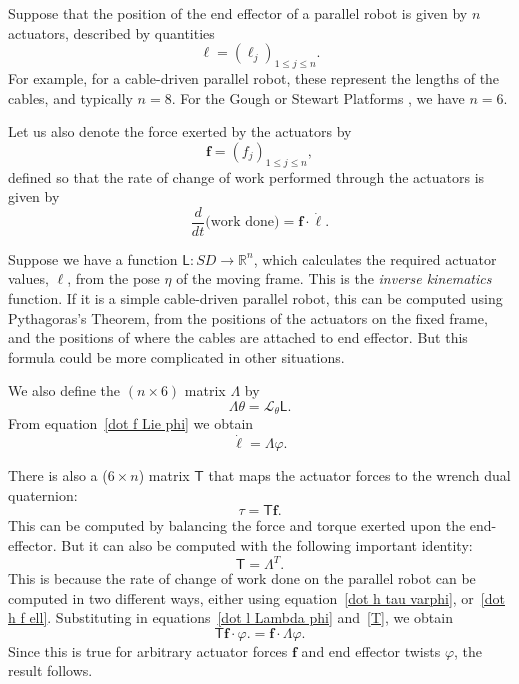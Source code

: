 \documentclass[reqno,12pt]{amsart}
\newcommand\setunitdualquat{SD}
\newcommand{\liederiv}{\mathcal L}
\begin{document}
Suppose that the position of the end effector of a parallel robot is given by $n$ actuators, described by quantities
\begin{equation}
\bm \ell = (\ell_j)_{1 \le j \le n} .
\end{equation}
For example, for a cable-driven parallel robot, these represent the lengths of the cables, and typically $n = 8$.  For the Gough or Stewart Platforms \cite{gallardo-alvarado}, we have $n = 6$.

Let us also denote the force exerted by the actuators by 
\begin{equation}
\bm f = (f_j)_{1 \le j \le n} ,
\end{equation}
defined so that the rate of change of work performed through the actuators is given by
\begin{equation}
\label{dot h f ell}
\frac{d}{dt} \text{(work done)} = \bm f \cdot \dot{\bm\ell} .
\end{equation}

Suppose we have a function $\mathsf L : \setunitdualquat \to \mathbb R^n$, which calculates the required actuator values, $\bm \ell$, from the pose $\eta$ of the moving frame.  This is the \emph{inverse kinematics} function.  If it is a simple cable-driven parallel robot, this can be computed using Pythagoras's Theorem, from the positions of the actuators on the fixed frame, and the positions of where the cables are attached to end effector.  But this formula could be more complicated in other situations.

We also define the $(n \times 6)$ matrix $\mathsf \Lambda$ by
\begin{equation}
\label{Lambda}
\mathsf \Lambda \theta = \liederiv_\theta \mathsf L .
\end{equation}
From equation~\eqref{dot f Lie phi} we obtain
\begin{equation}
\label{dot l Lambda phi}
\dot{\bm \ell} = \mathsf \Lambda \varphi .
\end{equation}

There is also a ($6 \times n$) matrix $\mathsf T$ that maps the actuator forces to the wrench dual quaternion:
\begin{equation}
\label{T}
\tau = \mathsf T \bm f .
\end{equation}
This can be computed by balancing the force and torque exerted upon the end-effector.  But it can also be computed with the following important identity:
\begin{equation}
\label{T=L^T}
\mathsf T = \mathsf \Lambda^T.
\end{equation}
This is because the rate of change of work done on the parallel robot can be computed in two different ways, either using equation~\eqref{dot h tau varphi}, or~\eqref{dot h f ell}.  Substituting in equations~\eqref{dot l Lambda phi} and~\eqref{T}, we obtain
\begin{equation}
\mathsf T \bm f \cdot \varphi.= \bm f \cdot \mathsf \Lambda \varphi.
\end{equation}
Since this is true for arbitrary actuator forces $\bm f$ and end effector twists $\varphi$, the result follows.
\end{document}
